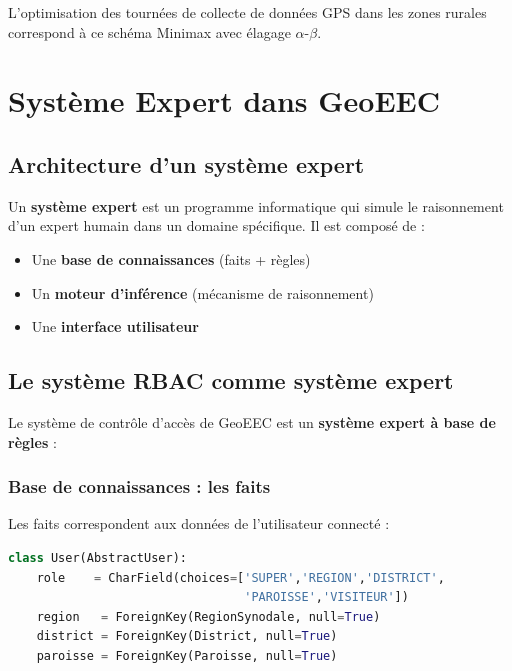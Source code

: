 \documentclass[12pt, a4paper]{report}
\theoremstyle{definition}
\begin{document}
L'optimisation des tournées de collecte de données GPS dans les zones rurales correspond à ce schéma Minimax avec élagage $\alpha$-$\beta$.

\chapter{Système Expert dans GeoEEC}

\section{Architecture d'un système expert}

\begin{tcolorbox}[defbox, title=Système Expert]
Un \textbf{système expert} est un programme informatique qui simule le raisonnement d'un expert humain dans un domaine spécifique. Il est composé de :
\begin{itemize}
  \item Une \textbf{base de connaissances} (faits + règles)
  \item Un \textbf{moteur d'inférence} (mécanisme de raisonnement)
  \item Une \textbf{interface utilisateur}
\end{itemize}
\end{tcolorbox}

\section{Le système RBAC comme système expert}

Le système de contrôle d'accès de GeoEEC est un \textbf{système expert à base de règles} :

\subsection{Base de connaissances : les faits}

Les faits correspondent aux données de l'utilisateur connecté :
\begin{lstlisting}[language=Python, caption=Faits du système expert (modèle User)]
class User(AbstractUser):
    role    = CharField(choices=['SUPER','REGION','DISTRICT',
                                 'PAROISSE','VISITEUR'])
    region   = ForeignKey(RegionSynodale, null=True)
    district = ForeignKey(District, null=True)
    paroisse = ForeignKey(Paroisse, null=True)
\end{lstlisting}
\end{document}
